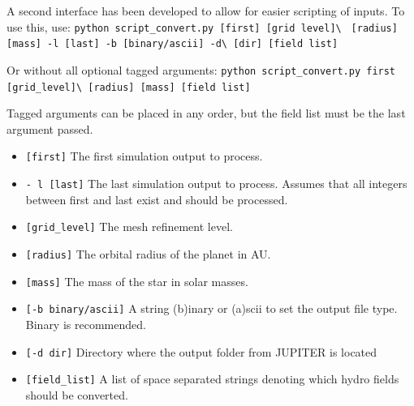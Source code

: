 \documentclass[twocolumn]{aastex62}
\begin{document}
A second interface has been developed to allow for easier scripting of inputs. To use this, use:
\verb|python script_convert.py [first] [grid level]\ | \newline \verb|[radius] [mass] -l [last] -b [binary/ascii] -d\ |\newline\verb|[dir] [field list]|

Or without all optional tagged arguments:\newline
\verb|python script_convert.py first [grid_level]\ |\newline \verb|[radius] [mass] [field list]|

Tagged arguments can be placed in any order, but the field list must be the last argument passed.
\begin{itemize}
	\item \verb|[first]| The first simulation output to process.
	\item \verb|- l [last]| The last simulation output to process. Assumes that all integers between first and last exist and should be processed.
	\item \verb|[grid_level]| The mesh refinement level.
	\item \verb|[radius]| The orbital radius of the planet in AU.
	\item \verb|[mass]| The mass of the star in solar masses.
	\item \verb|[-b binary/ascii]| A string (b)inary or (a)scii to set the output file type. Binary is recommended.
	\item \verb|[-d dir]| Directory where the output folder from JUPITER is located
	\item \verb|[field_list]| A list of space separated strings denoting which hydro fields should be converted.
\end{itemize}
\end{document}
